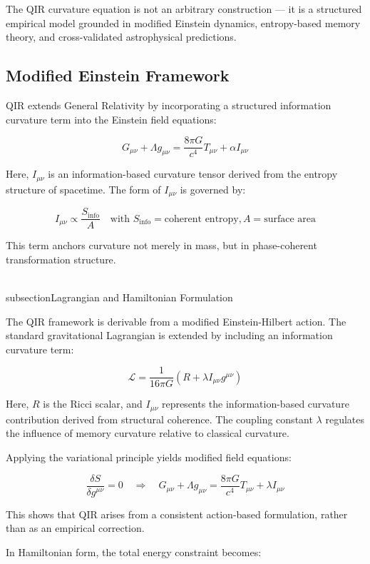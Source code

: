 \documentclass[11pt]{article}
\begin{document}
The QIR curvature equation is not an arbitrary construction — it is a structured empirical model grounded in modified Einstein dynamics, entropy-based memory theory, and cross-validated astrophysical predictions.

\subsection{Modified Einstein Framework}

QIR extends General Relativity by incorporating a structured information curvature term into the Einstein field equations:

\[
G_{\mu\nu} + \Lambda g_{\mu\nu} = \frac{8\pi G}{c^4} T_{\mu\nu} + \alpha I_{\mu\nu}
\]

Here, \(I_{\mu\nu}\) is an information-based curvature tensor derived from the entropy structure of spacetime. The form of \(I_{\mu\nu}\) is governed by:

\[
I_{\mu\nu} \propto \frac{S_{\text{info}}}{A} \quad \text{with } S_{\text{info}} = \text{coherent entropy}, A = \text{surface area}
\]

This term anchors curvature not merely in mass, but in phase-coherent transformation structure.

\\subsection{Lagrangian and Hamiltonian Formulation}

The QIR framework is derivable from a modified Einstein-Hilbert action. The standard gravitational Lagrangian is extended by including an information curvature term:

\[
\mathcal{L} = \frac{1}{16\pi G} \left( R + \lambda I_{\mu \nu} g^{\mu \nu} \right)
\]

Here, \(R\) is the Ricci scalar, and \(I_{\mu\nu}\) represents the information-based curvature contribution derived from structural coherence. The coupling constant \(\lambda\) regulates the influence of memory curvature relative to classical curvature.

Applying the variational principle yields modified field equations:

\[
\frac{\delta S}{\delta g^{\mu \nu}} = 0 \quad \Rightarrow \quad G_{\mu\nu} + \Lambda g_{\mu\nu} = \frac{8\pi G}{c^4} T_{\mu\nu} + \lambda I_{\mu\nu}
\]

This shows that QIR arises from a consistent action-based formulation, rather than as an empirical correction.

In Hamiltonian form, the total energy constraint becomes:
\end{document}
